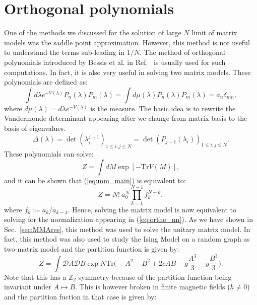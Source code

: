 \documentclass[11pt]{article}
\begin{document}
\section{\label{sec:Ortho_pol1}Orthogonal polynomials}
One of the methods we discussed for the solution of 
large $N$ limit of matrix models was the saddle point approximation. 
However, this method is not useful 
to understand the terms sub-leading in $1/N$. The method 
of orthogonal polynomials introduced by Bessis et al. in Ref.~\cite{Bessis:1980ss} 
is usually used for such computations. In fact, it is also very useful in 
solving two matrix 
models. These polynomials are defined as:
\begin{equation}
	\label{eq:ortho_nn} 
	\int d\lambda e^{-V(\lambda)} P_{n}(\lambda)
	P_{m}(\lambda) = \int d \mu(\lambda) P_{n}(\lambda)
	P_{m}(\lambda) = a_{n} \delta_{mn} ,
\end{equation}
where $d \mu(\lambda) = d\lambda e^{-V(\lambda)}$ is the measure. 
The basic idea is to rewrite the Vandermonde determinant appearing after we change from matrix basis to the basis of eigenvalues. 
\begin{equation}
	\Delta(\lambda) = \det(\lambda_{i}^{j-1})_{1 \le i, j \le N} = \det(P_{j-1}(\lambda_i))_{1 \le i, j \le N}. 
\end{equation}
These polynomials can solve:
\begin{equation}
	\label{eq:mm_main}
	Z = \int dM \exp[-\mbox{Tr} V(M)] ,
\end{equation}
and it can be shown that (\ref{eq:mm_main}) is equivalent to:
\begin{equation}
\label{eq:ZOP} 
	Z = N! ~ a_{0}^{N} \prod_{k=1}^{N-1} f_{k}^{N-k},
\end{equation}
where $f_{k} := a_{k}/a_{k-1}$. Hence, solving the matrix model is now equivalent to solving for the 
normalization appearing in (\ref{eq:ortho_nn}). As we have shown in Sec.~\ref{sec:MMAres}, 
this method was used to solve the unitary 
matrix model. In fact, this method was also used to study the Ising Model on a random graph as two-matrix model 
\cite{Kazakov:1986hu}
and the partition function is given by:
\begin{equation}
	\label{eq:Kaz1} 
	Z = \int \mathcal{D}A \mathcal{D}B \exp N \mbox{Tr} \Bigg(-A^2 -B^2 + 2c AB -g \frac{A^3}{3} - g\frac{B^3}{3}  \Bigg). 
\end{equation}
Note that this has a $\mathbb{Z}_{2}$ symmetry because of 
the partition function being invariant under $A \mapsto B$. This is however broken in finite magnetic fields ($h \neq 0$) and the partition fuction in that case is given by:
\end{document}
